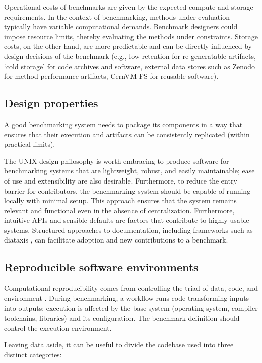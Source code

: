 \documentclass[11pt]{article}
\begin{document}
Operational costs of benchmarks are given by the expected compute and storage requirements. In the context of benchmarking, methods under evaluation typically have variable computational demands. Benchmark designers could impose resource limits, thereby evaluating the methods under constraints. Storage costs, on the other hand, are more predictable and can be directly influenced by design decisions of the benchmark (e.g., low retention for re-generatable artifacts, `cold storage' for code archives and software, external data stores such as Zenodo for method performance artifacts, CernVM-FS for reusable software).

\subsection*{Design properties}

A good benchmarking system needs to package its components in a way that ensures that their execution and artifacts can be consistently replicated (within practical limits).

The UNIX design philosophy \cite{Pike1984-we} is worth embracing to produce software for benchmarking systems that are lightweight, robust, and easily maintainable; ease of use and extensibility are also desirable. Furthermore, to reduce the entry barrier for contributors, the benchmarking system should be capable of running locally with minimal setup. This approach ensures that the system remains relevant and functional even in the absence of centralization. Furthermore, intuitive APIs and sensible defaults \cite{Proctor2018-do} are factors that contribute to highly usable systems. Structured approaches to documentation, including frameworks such as diataxis \cite{ProcidaUnknown-vf}, can facilitate adoption and new contributions to a benchmark.

\subsection*{Reproducible software environments \label{softwareenvs}}

Computational reproducibility comes from controlling the triad of data, code, and environment \cite{Hill2024-gf}. During benchmarking, a workflow runs code transforming inputs into outputs; execution is affected by the base system (operating system, compiler toolchains, libraries) and its configuration. The benchmark definition should control the execution environment.

Leaving data aside, it can be useful to divide the codebase used into three distinct categories:
\end{document}
